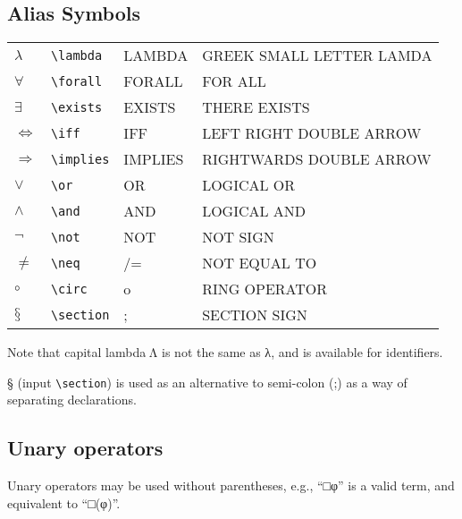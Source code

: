 \subsection{Alias Symbols}

\begin{center}
\smaller
{} \label{unicode:aliases}
\begin{xtabular}{|ll>{\ttfamily}l>{\smaller\ttfamily}l|}\hline
  $λ$ & \verb|\lambda| & LAMBDA & GREEK SMALL LETTER LAMDA \\
  $∀$ & \verb|\forall| & FORALL & FOR ALL \\
  $∃$ & \verb|\exists| & EXISTS & THERE EXISTS \\
  $⇔$ & \verb|\iff| & IFF & LEFT RIGHT DOUBLE ARROW \\
  $⇒$ & \verb|\implies| & IMPLIES & RIGHTWARDS DOUBLE ARROW \\
  $∨$ & \verb|\or| & OR & LOGICAL OR \\
  $∧$ & \verb|\and| & AND & LOGICAL AND \\
  $¬$ & \verb|\not| & NOT & NOT SIGN \\
  $≠$ & \verb|\neq| & /= & NOT EQUAL TO \\
  $∘$ & \verb|\circ| & o & RING OPERATOR \\
  $§$ & \verb|\section| & ; & SECTION SIGN \\ \hline
\end{xtabular}
\end{center}
  
Note that capital lambda Λ is not the same as λ, and is available for
identifiers.

§ (input \verb|\section|) is used as an alternative to semi-colon (;) as a
way of separating declarations.

\subsection{Unary operators}

Unary operators may be used without parentheses, e.g., ``□φ'' is a valid
term, and equivalent to ``□(φ)''.

